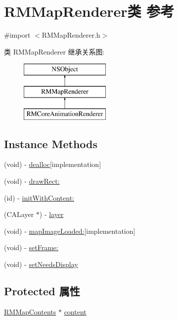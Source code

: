 \hypertarget{interface_r_m_map_renderer}{\section{R\-M\-Map\-Renderer类 参考}
\label{interface_r_m_map_renderer}
}


{\ttfamily \#import $<$R\-M\-Map\-Renderer.\-h$>$}

类 R\-M\-Map\-Renderer 继承关系图\-:\begin{figure}[H]
\begin{center}
\leavevmode
\includegraphics[height=3.000000cm]{interface_r_m_map_renderer}
\end{center}
\end{figure}
\subsection*{Instance Methods}
\begin{DoxyCompactItemize}
\item 
(void) -\/ \hyperlink{interface_r_m_map_renderer_a171d7fd81412009ed1f92f27c5ec6f2a}{dealloc}{\ttfamily  \mbox{[}implementation\mbox{]}}
\item 
(void) -\/ \hyperlink{interface_r_m_map_renderer_a0f3802416a587d84d9b04b289f577190}{draw\-Rect\-:}
\item 
(id) -\/ \hyperlink{interface_r_m_map_renderer_a439495e611ee8960c35d5272089f7b57}{init\-With\-Content\-:}
\item 
(C\-A\-Layer $\ast$) -\/ \hyperlink{interface_r_m_map_renderer_a388de8a3bd1c56a07bc69f8967f34037}{layer}
\item 
(void) -\/ \hyperlink{interface_r_m_map_renderer_aa509a04f8b9702d4a4ea3010ca681f05}{map\-Image\-Loaded\-:}{\ttfamily  \mbox{[}implementation\mbox{]}}
\item 
(void) -\/ \hyperlink{interface_r_m_map_renderer_a9191dc45f6215897f0e601e085850d1d}{set\-Frame\-:}
\item 
(void) -\/ \hyperlink{interface_r_m_map_renderer_a5351f5a213da59e4646c0ad6e49db22b}{set\-Needs\-Display}
\end{DoxyCompactItemize}
\subsection*{Protected 属性}
\begin{DoxyCompactItemize}
\item 
\hyperlink{interface_r_m_map_contents}{R\-M\-Map\-Contents} $\ast$ \hyperlink{interface_r_m_map_renderer_a6dc63e478a69b3262bd89acb37ea7bcb}{content}
\end{DoxyCompactItemize}


